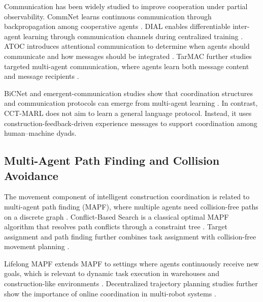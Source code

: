 \documentclass[preprint,12pt]{elsarticle}
\begin{document}
Communication has been widely studied to improve cooperation under partial observability. CommNet learns continuous communication through backpropagation among cooperative agents \cite{Sukhbaatar2016CommNet}. DIAL enables differentiable inter-agent learning through communication channels during centralized training \cite{Foerster2016DIAL}. ATOC introduces attentional communication to determine when agents should communicate and how messages should be integrated \cite{Jiang2018ATOC}. TarMAC further studies targeted multi-agent communication, where agents learn both message content and message recipients \cite{Das2019TarMAC}.

BiCNet and emergent-communication studies show that coordination structures and communication protocols can emerge from multi-agent learning \cite{Peng2017BiCNet,Mordatch2018EmergentLanguage}. In contrast, CCT-MARL does not aim to learn a general language protocol. Instead, it uses construction-feedback-driven experience messages to support coordination among human--machine dyads.

\subsection{Multi-Agent Path Finding and Collision Avoidance}

The movement component of intelligent construction coordination is related to multi-agent path finding (MAPF), where multiple agents need collision-free paths on a discrete graph \cite{Stern2019MAPF}. Conflict-Based Search is a classical optimal MAPF algorithm that resolves path conflicts through a constraint tree \cite{Sharon2015CBS}. Target assignment and path finding further combines task assignment with collision-free movement planning \cite{MaKoenig2016TAPF}.

Lifelong MAPF extends MAPF to settings where agents continuously receive new goals, which is relevant to dynamic task execution in warehouses and construction-like environments \cite{Li2021LifelongMAPF}. Decentralized trajectory planning studies further show the importance of online coordination in multi-robot systems \cite{Cap2015DecentralizedPlanning}.
\end{document}
